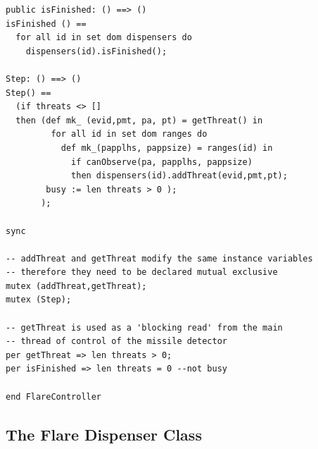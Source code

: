 \documentclass{overturerepchap}
\begin{document}
\begin{lstlisting}
public isFinished: () ==> ()
isFinished () ==
  for all id in set dom dispensers do
    dispensers(id).isFinished();

Step: () ==> ()
Step() ==
  (if threats <> []
  then (def mk_ (evid,pmt, pa, pt) = getThreat() in
         for all id in set dom ranges do
           def mk_(papplhs, pappsize) = ranges(id) in
             if canObserve(pa, papplhs, pappsize)
             then dispensers(id).addThreat(evid,pmt,pt);
        busy := len threats > 0 );
       );

sync

-- addThreat and getThreat modify the same instance variables
-- therefore they need to be declared mutual exclusive
mutex (addThreat,getThreat);
mutex (Step);

-- getThreat is used as a 'blocking read' from the main
-- thread of control of the missile detector
per getThreat => len threats > 0;
per isFinished => len threats = 0 --not busy

end FlareController
\end{lstlisting}

\subsection{The Flare Dispenser Class}
\end{document}
